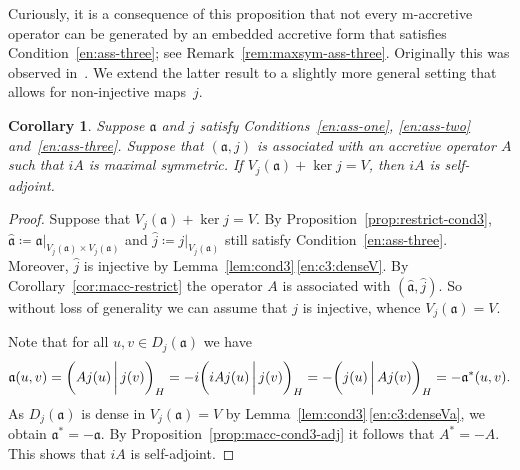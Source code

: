 \documentclass[a4paper,oneside,12pt]{amsart}
\theoremstyle{plain}
\newtheorem{corollary}[theorem]{Corollary}
\theoremstyle{definition}
\begin{document}
Curiously, it is a consequence of this proposition that not every {\ensuremath{\text{m}}}-accretive operator can be generated by
an embedded accretive form that satisfies Condition~\ref{en:ass-three}; see Remark~\ref{rem:maxsym-ass-three}. Originally this was observed in~\cite[Introduction and Theorem~4.2]{McIntosh70:bilinear}. 
We extend the latter result to a slightly more general setting that allows for non-injective maps~$j$.
\begin{corollary}\label{cor:max-sym-nosa}
Suppose ${{\mathfrak{{a}}}}$ and $j$ satisfy Conditions~\ref{en:ass-one}, \ref{en:ass-two} and~\ref{en:ass-three}. 
Suppose that $({{\mathfrak{{a}}}},j)$ is associated with an accretive operator $A$ such that $iA$ is maximal symmetric.
If $V_j({{\mathfrak{{a}}}})+\ker j=V$, then $iA$ is self-adjoint.
\end{corollary}
\begin{proof}
Suppose that $V_j({{\mathfrak{{a}}}})+\ker j = V$. By Proposition~\ref{prop:restrict-cond3}, ${{\mathfrak{{\hat{a}}}}} \coloneqq {\ensuremath{{{{\mathfrak{{a}}}}}|_{{V_j({{\mathfrak{{a}}}})\times V_j({{\mathfrak{{a}}}})}}}}$ and
$\hat{j}\coloneqq {\ensuremath{{j}|_{{V_j({{\mathfrak{{a}}}})}}}}$ still satisfy Condition~\ref{en:ass-three}. 
Moreover, $\hat{j}$ is injective by Lemma~\ref{lem:cond3}\,\ref{en:c3:denseV}.
By Corollary~\ref{cor:macc-restrict} the operator $A$ is associated with $({{\mathfrak{{\hat{a}}}}},\hat{j})$.
So without loss of generality we can assume that $j$ is injective, whence $V_j({{\mathfrak{{a}}}})=V$.

Note that for all $u,v\in D_j({{\mathfrak{{a}}}})$ we have
\[
    {{\mathfrak{{a}}}}(u,v) = {{\ifthenelse{\equal{auto}{auto}}{\left({Aj(u)}\mkern3mu{\biggm|}\mkern3mu {j(v)}\right)}{}
\ifthenelse{\equal{auto}{b}}{\bigl({Aj(u)}\mkern3mu{\biggm|}\mkern3mu {j(v)}\bigr)}{}
\ifthenelse{\equal{auto}{B}}{\Bigl({Aj(u)}\mkern3mu{\bigm|}\mkern3mu {j(v)}\Bigr)}{}
}}_H = -i{{\ifthenelse{\equal{auto}{auto}}{\left({iA j(u)}\mkern3mu{\biggm|}\mkern3mu {j(v)}\right)}{}
\ifthenelse{\equal{auto}{b}}{\bigl({iA j(u)}\mkern3mu{\biggm|}\mkern3mu {j(v)}\bigr)}{}
\ifthenelse{\equal{auto}{B}}{\Bigl({iA j(u)}\mkern3mu{\bigm|}\mkern3mu {j(v)}\Bigr)}{}
}}_H = -{{\ifthenelse{\equal{auto}{auto}}{\left({j(u)}\mkern3mu{\biggm|}\mkern3mu {Aj(v)}\right)}{}
\ifthenelse{\equal{auto}{b}}{\bigl({j(u)}\mkern3mu{\biggm|}\mkern3mu {Aj(v)}\bigr)}{}
\ifthenelse{\equal{auto}{B}}{\Bigl({j(u)}\mkern3mu{\bigm|}\mkern3mu {Aj(v)}\Bigr)}{}
}}_H = -{{\mathfrak{{a}}}}^*(u,v).
\]
As $D_j({{\mathfrak{{a}}}})$ is dense in $V_j({{\mathfrak{{a}}}})=V$ by Lemma~\ref{lem:cond3}\,\ref{en:c3:denseVa}, 
we obtain ${{\mathfrak{{a}}}}^*=-{{\mathfrak{{a}}}}$. 
By Proposition~\ref{prop:macc-cond3-adj} it follows that $A^*=-A$.
This shows that $iA$ is self-adjoint.
\end{proof}
\end{document}
